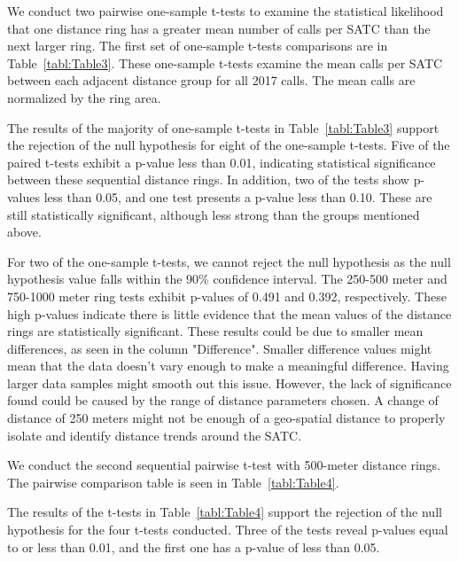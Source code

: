 \documentclass[12pt]{article}
\begin{document}
We conduct two pairwise one-sample t-tests to examine the statistical likelihood that one distance ring has a greater mean number of calls per SATC than the next larger ring. The first set of one-sample t-tests comparisons are in Table~\ref{tabl:Table3}. These one-sample t-tests examine the mean calls per SATC between each adjacent distance group for all 2017 calls. The mean calls are normalized by the ring area. 


\label{tabl:Table3}


The results of the majority of one-sample t-tests in Table~\ref{tabl:Table3} support the rejection of the null hypothesis for eight of the one-sample t-tests. Five of the paired t-tests exhibit a p-value less than 0.01, indicating statistical significance between these sequential distance rings. In addition, two of the tests show p-values less than 0.05, and one test presents a p-value less than 0.10. These are still statistically significant, although less strong than the groups mentioned above. 

\label{tabl:Table4}

For two of the one-sample t-tests, we cannot reject the null hypothesis as the null hypothesis value falls within the 90\% confidence interval. The 250-500 meter and 750-1000 meter ring tests exhibit p-values of 0.491 and 0.392, respectively. These high p-values indicate there is little evidence that the mean values of the distance rings are statistically significant. These results could be due to smaller mean differences, as seen in the column "Difference". Smaller difference values might mean that the data doesn't vary enough to make a meaningful difference. Having larger data samples might smooth out this issue. However, the lack of significance found could be caused by the range of distance parameters chosen. A change of distance of 250 meters might not be enough of a geo-spatial distance to properly isolate and identify distance trends around the SATC.

We conduct the second sequential pairwise t-test with 500-meter distance rings. The pairwise comparison table is seen in Table~\ref{tabl:Table4}. 

The results of the t-tests in Table~\ref{tabl:Table4} support the rejection of the null hypothesis for the four t-tests conducted. Three of the tests reveal p-values equal to or less than 0.01, and the first one has a p-value of less than 0.05. 
\end{document}
